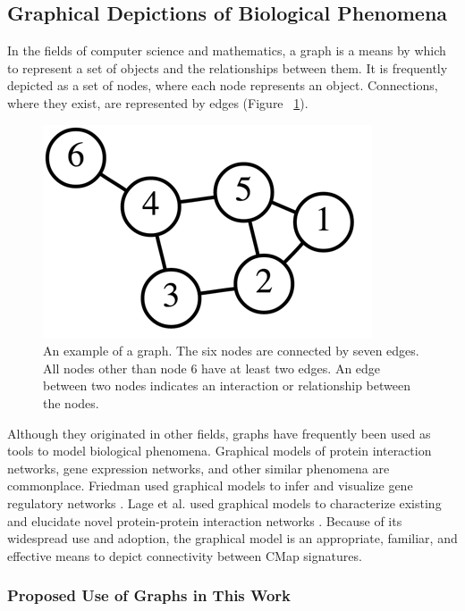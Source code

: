 \documentclass[12pt]{article}
\begin{document}
\subsection{Graphical Depictions of Biological Phenomena}

In the fields of computer science and mathematics, a graph is a means by which to represent a set of objects and the relationships between them. It is frequently depicted as a set of nodes, where each node represents an object. Connections, where they exist, are represented by edges (Figure ~\ref{fig:graph}).

\begin{figure}[h]
\centering
\includegraphics[scale=0.5]{img/graph_example.png}
\caption{An example of a graph. The six nodes are connected by seven edges. All nodes other than node 6 have at least two edges. An edge between two nodes indicates an interaction or relationship between the nodes.}
\label{fig:graph}
\end{figure} 

Although they originated in other fields, graphs have frequently been used as tools to model biological phenomena. Graphical models of protein interaction networks, gene expression networks, and other similar phenomena are commonplace. Friedman used graphical models to infer and visualize gene regulatory networks \cite{friedman_inferring_2004}. Lage et al. used graphical models to characterize existing and elucidate novel protein-protein interaction networks \cite{lage_human_2007}. Because of its widespread use and adoption, the graphical model is an appropriate, familiar, and effective means to depict connectivity between CMap signatures.

\subsubsection{Proposed Use of Graphs in This Work}
\end{document}
